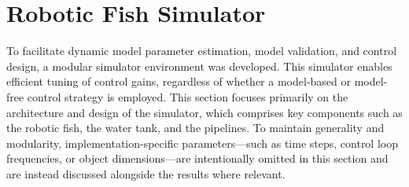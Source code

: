 \documentclass[pdflatex,sn-mathphys-num]{sn-jnl}
\theoremstyle{thmstyleone}%
\begin{document}
\section{Robotic Fish Simulator}
\par To facilitate dynamic model parameter estimation, model validation, and control design, a modular simulator environment was developed. This simulator enables efficient tuning of control gains, regardless of whether a model-based or model-free control strategy is employed. This section focuses primarily on the architecture and design of the simulator, which comprises key components such as the robotic fish, the water tank, and the pipelines. To maintain generality and modularity, implementation-specific parameters—such as time steps, control loop frequencies, or object dimensions—are intentionally omitted in this section and are instead discussed alongside the results where relevant. 
\end{document}
